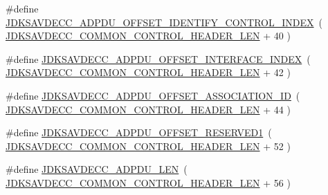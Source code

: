 \begin{DoxyCompactItemize}
\item 
\#define \hyperlink{group__adpdu_ga31f944888be178e00b333dd6978eb5c2}{J\+D\+K\+S\+A\+V\+D\+E\+C\+C\+\_\+\+A\+D\+P\+D\+U\+\_\+\+O\+F\+F\+S\+E\+T\+\_\+\+I\+D\+E\+N\+T\+I\+F\+Y\+\_\+\+C\+O\+N\+T\+R\+O\+L\+\_\+\+I\+N\+D\+EX}~( \hyperlink{group__jdksavdecc__avtp__common__control__header_gaae84052886fb1bb42f3bc5f85b741dff}{J\+D\+K\+S\+A\+V\+D\+E\+C\+C\+\_\+\+C\+O\+M\+M\+O\+N\+\_\+\+C\+O\+N\+T\+R\+O\+L\+\_\+\+H\+E\+A\+D\+E\+R\+\_\+\+L\+EN} + 40 )
\item 
\#define \hyperlink{group__adpdu_gaea82d7dfa4a13a7db9b97a3f906bb77b}{J\+D\+K\+S\+A\+V\+D\+E\+C\+C\+\_\+\+A\+D\+P\+D\+U\+\_\+\+O\+F\+F\+S\+E\+T\+\_\+\+I\+N\+T\+E\+R\+F\+A\+C\+E\+\_\+\+I\+N\+D\+EX}~( \hyperlink{group__jdksavdecc__avtp__common__control__header_gaae84052886fb1bb42f3bc5f85b741dff}{J\+D\+K\+S\+A\+V\+D\+E\+C\+C\+\_\+\+C\+O\+M\+M\+O\+N\+\_\+\+C\+O\+N\+T\+R\+O\+L\+\_\+\+H\+E\+A\+D\+E\+R\+\_\+\+L\+EN} + 42 )
\item 
\#define \hyperlink{group__adpdu_gad85e8e78a5189255a429b5bfe4b1751c}{J\+D\+K\+S\+A\+V\+D\+E\+C\+C\+\_\+\+A\+D\+P\+D\+U\+\_\+\+O\+F\+F\+S\+E\+T\+\_\+\+A\+S\+S\+O\+C\+I\+A\+T\+I\+O\+N\+\_\+\+ID}~( \hyperlink{group__jdksavdecc__avtp__common__control__header_gaae84052886fb1bb42f3bc5f85b741dff}{J\+D\+K\+S\+A\+V\+D\+E\+C\+C\+\_\+\+C\+O\+M\+M\+O\+N\+\_\+\+C\+O\+N\+T\+R\+O\+L\+\_\+\+H\+E\+A\+D\+E\+R\+\_\+\+L\+EN} + 44 )
\item 
\#define \hyperlink{group__adpdu_ga96ee13854c7f3a94f95dcc72d102e17b}{J\+D\+K\+S\+A\+V\+D\+E\+C\+C\+\_\+\+A\+D\+P\+D\+U\+\_\+\+O\+F\+F\+S\+E\+T\+\_\+\+R\+E\+S\+E\+R\+V\+E\+D1}~( \hyperlink{group__jdksavdecc__avtp__common__control__header_gaae84052886fb1bb42f3bc5f85b741dff}{J\+D\+K\+S\+A\+V\+D\+E\+C\+C\+\_\+\+C\+O\+M\+M\+O\+N\+\_\+\+C\+O\+N\+T\+R\+O\+L\+\_\+\+H\+E\+A\+D\+E\+R\+\_\+\+L\+EN} + 52 )
\item 
\#define \hyperlink{group__adpdu_gabe529d24b7763823bb8536b1b50b2dcc}{J\+D\+K\+S\+A\+V\+D\+E\+C\+C\+\_\+\+A\+D\+P\+D\+U\+\_\+\+L\+EN}~( \hyperlink{group__jdksavdecc__avtp__common__control__header_gaae84052886fb1bb42f3bc5f85b741dff}{J\+D\+K\+S\+A\+V\+D\+E\+C\+C\+\_\+\+C\+O\+M\+M\+O\+N\+\_\+\+C\+O\+N\+T\+R\+O\+L\+\_\+\+H\+E\+A\+D\+E\+R\+\_\+\+L\+EN} + 56 )
\end{DoxyCompactItemize}

